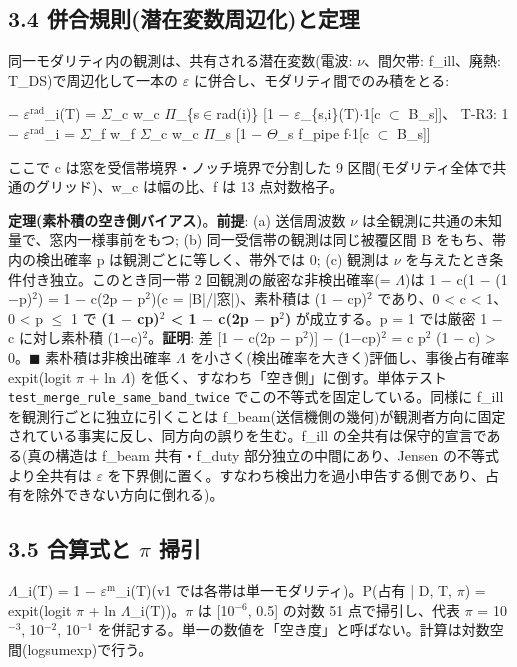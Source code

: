 \documentclass[11pt]{article}
\begin{document}
\subsection*{3.4 併合規則(潜在変数周辺化)と定理}
\noindent 同一モダリティ内の観測は、共有される潜在変数(電波: \(\nu\)、間欠帯: f\_ill、廃熱: T\_DS)で周辺化して一本の \(\varepsilon\) に併合し、モダリティ間でのみ積をとる:\par\smallskip

 \(-\) \(\varepsilon\)\(^{\mathrm{rad}}\)\_i(T) = \(\Sigma\)\_c w\_c \(\Pi\)\_\{s\(\in\)rad(i)\} [1 \(-\) \(\varepsilon\)\_\{s,i\}(T)\(\cdot\)1[c \(\subset\) B\_s]]、 T-R3: 1 \(-\) \(\varepsilon\)\(^{\mathrm{rad}}\)\_i = \(\Sigma\)\_f w\_f \(\Sigma\)\_c w\_c \(\Pi\)\_s [1 \(-\) \(\Theta\)\_s f\_pipe f\(\cdot\)1[c \(\subset\) B\_s]]\par\smallskip

\noindent ここで c は窓を受信帯境界・ノッチ境界で分割した 9 区間(モダリティ全体で共通のグリッド)、w\_c は幅の比、f は 13 点対数格子。\par\smallskip

\noindent \textbf{定理(素朴積の空き側バイアス)}。\textbf{前提}: (a) 送信周波数 \(\nu\) は全観測に共通の未知量で、窓内一様事前をもつ; (b) 同一受信帯の観測は同じ被覆区間 B をもち、帯内の検出確率 p は観測ごとに等しく、帯外では 0; (c) 観測は \(\nu\) を与えたとき条件付き独立。このとき同一帯 2 回観測の厳密な非検出確率(= \(\Lambda\))は 1 \(-\) c(1 \(-\) (1\(-\)p)\(^{2}\)) = 1 \(-\) c(2p \(-\) p\(^{2}\))(c = |B|/|窓|)、素朴積は (1 \(-\) cp)\(^{2}\) であり、0 < c < 1、0 < p \(\leq\) 1 で \textbf{(1 \(-\) cp)\(^{2}\) < 1 \(-\) c(2p \(-\) p\(^{2}\))} が成立する。p = 1 では厳密 1 \(-\) c に対し素朴積 (1\(-\)c)\(^{2}\)。\textbf{証明}: 差 [1 \(-\) c(2p \(-\) p\(^{2}\))] \(-\) (1\(-\)cp)\(^{2}\) = c p\(^{2}\) (1 \(-\) c) > 0。\(\blacksquare\) 素朴積は非検出確率 \(\Lambda\) を小さく(検出確率を大きく)評価し、事後占有確率 expit(logit \(\pi\) + ln \(\Lambda\)) を低く、すなわち「空き側」に倒す。単体テスト \texttt{test\_merge\_rule\_same\_band\_twice} でこの不等式を固定している。同様に f\_ill を観測行ごとに独立に引くことは f\_beam(送信機側の幾何)が観測者方向に固定されている事実に反し、同方向の誤りを生む。f\_ill の全共有は保守的宣言である(真の構造は f\_beam 共有・f\_duty 部分独立の中間にあり、Jensen の不等式より全共有は \(\varepsilon\) を下界側に置く。すなわち検出力を過小申告する側であり、占有を除外できない方向に倒れる)。\par\smallskip

\subsection*{3.5 合算式と \(\pi\) 掃引}
\noindent \(\Lambda\)\_i(T) = 1 \(-\) \(\varepsilon\)\(^{\mathrm{m}}\)\_i(T)(v1 では各帯は単一モダリティ)。P(占有 | D, T, \(\pi\)) = expit(logit \(\pi\) + ln \(\Lambda\)\_i(T))。\(\pi\) は [10\(^{-6}\), 0.5] の対数 51 点で掃引し、代表 \(\pi\) = 10\(^{-3}\), 10\(^{-2}\), 10\(^{-1}\) を併記する。単一の数値を「空き度」と呼ばない。計算は対数空間(logsumexp)で行う。\par\smallskip
\end{document}

